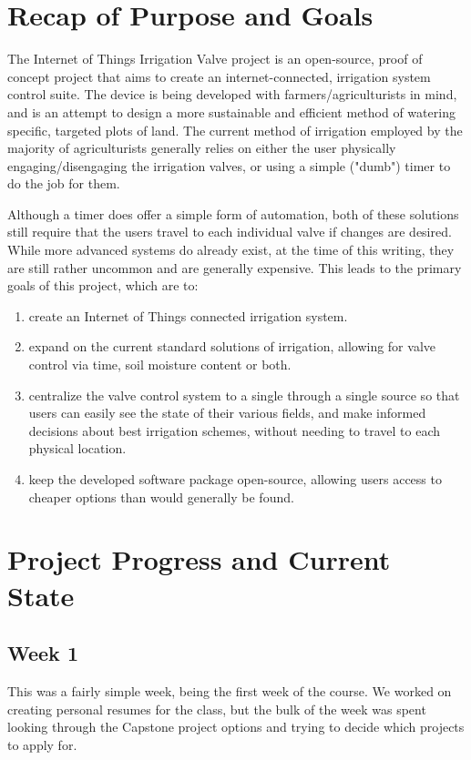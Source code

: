 \documentclass[onecolumn, draftclsnofoot,10pt, compsoc]{IEEEtran}
\begin{document}
    \section{Recap of Purpose and Goals}
    The Internet of Things Irrigation Valve project is an open-source, proof of concept project that aims to create an internet-connected, irrigation system control suite.
    The device is being developed with farmers/agriculturists in mind, and is an attempt to design a more sustainable and efficient method of watering specific, targeted plots of land.
    The current method of irrigation employed by the majority of agriculturists generally relies on either the user physically engaging/disengaging the irrigation valves, or using a simple ("dumb") timer to do the job for them.
    
    Although a timer does offer a simple form of automation, both of these solutions still require that the users travel to each individual valve if changes are desired.
    While more advanced systems do already exist, at the time of this writing, they are still rather uncommon and are generally expensive.
    This leads to the primary goals of this project, which are to:
    \begin{enumerate}
    \item create an Internet of Things connected irrigation system. 
    \item expand on the current standard solutions of irrigation, allowing for valve control via time, soil moisture content or both.
    \item centralize the valve control system to a single through a single source so that users can easily see the state of their various fields, and make informed decisions about best irrigation schemes, without needing to travel to each physical location.
    \item keep the developed software package open-source, allowing users access to cheaper options than would generally be found.
    \end{enumerate}

    \section{Project Progress and Current State}
    \subsection{Week 1}
    This was a fairly simple week, being the first week of the course.
    We worked on creating personal resumes for the class, but the bulk of the week was spent looking through the Capstone project options and trying to decide which projects to apply for. 
    
\end{document}
